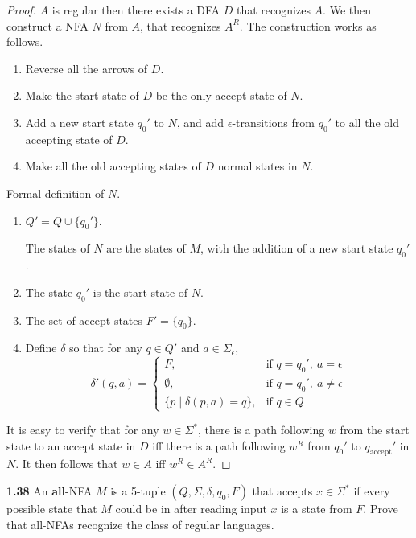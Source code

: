 \begin{mdframed}
\begin{proof}
$A$ is regular then there exists a DFA $D$ that recognizes $A$. We then construct a NFA $N$ from $A$, that recognizes $A^R$. The construction works as follows.

\begin{enumerate}
\item Reverse all the arrows of $D$.
\item Make the start state of $D$ be the only accept state of $N$.
\item Add a new start state $q_0'$ to $N$, and add $\epsilon$-transitions from $q_0'$ to all the old accepting state of $D$.
\item Make all the old accepting states of $D$ normal states in $N$.
\end{enumerate}

Formal definition of $N$.
\begin{enumerate}
\item $Q' = Q \cup \{q_0'\}$.

The states of $N$ are the states of $M$, with the addition of a new start state $q_0'$.

\item The state $q_0'$ is the start state of $N$.

\item The set of accept states $F' = \{ q_0 \}$.

\item Define $\delta$ so that for any $q \in Q'$ and $a \in \Sigma_\epsilon$,
\[
\delta'(q, a) = 
\begin{cases}
F, 			& \text{if } q = q_0',\  a = \epsilon \\
\emptyset, 	& \text{if } q = q_0',\  a \neq \epsilon \\
\{p \mid \delta(p, a) = q\}, & \text{if } q \in Q
\end{cases}
\]
\end{enumerate}

It is easy to verify that for any $w \in \Sigma^*$, there is a path following $w$ from the start state to an accept state in $D$ iff there is a path following $w^R$ from $q_0'$ to $q_\text{accept}'$ in $N$. It then follows that $w \in A$ iff $w^R \in A^R$.
\end{proof}
\end{mdframed}

\textbf{1.38} An \textbf{all}-NFA $M$ is a 5-tuple $(Q, \Sigma, \delta, q_0, F)$ that accepts $x \in \Sigma^*$ if every possible state that $M$ could be in after reading input $x$ is a state from $F$. Prove that all-NFAs recognize the class of regular languages.


